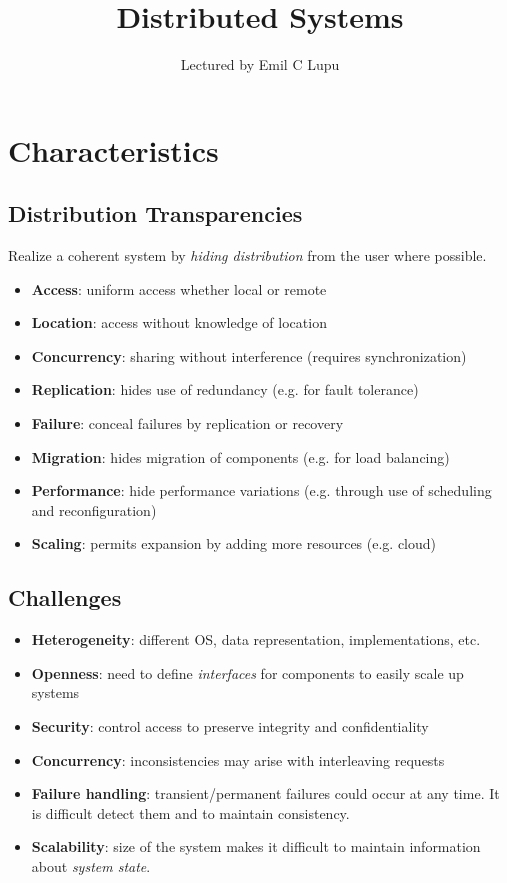 \documentclass[twocolumn,landscape,10pt]{article}
\author{Lectured by Emil C Lupu}
\title{Distributed Systems}
\affil{Typed by Aris Zhu Yi Qing}
\theoremstyle{definition}
\begin{document}
\maketitle
\tableofcontents
\newpage

\section{Characteristics}

\subsection{Distribution Transparencies}

Realize a coherent system by \emph{hiding distribution} from the user where
possible.

\begin{itemize}
    \item \textbf{Access}: uniform access whether local or remote
    \item \textbf{Location}: access without knowledge of location
    \item \textbf{Concurrency}: sharing without interference (requires synchronization)
    \item \textbf{Replication}: hides use of redundancy (e.g. for fault tolerance)
    \item \textbf{Failure}: conceal failures by replication or recovery
    \item \textbf{Migration}: hides migration of components (e.g. for load balancing)
    \item \textbf{Performance}: hide performance variations (e.g. through use of
        scheduling and reconfiguration)
    \item \textbf{Scaling}: permits expansion by adding more resources (e.g. cloud)
\end{itemize} 

\subsection{Challenges}

\begin{itemize}
    \item \textbf{Heterogeneity}: different OS, data
        representation, implementations, etc.
    \item \textbf{Openness}: need to define \emph{interfaces} for components to
        easily scale up systems
    \item \textbf{Security}: control access to preserve integrity and
        confidentiality
    \item \textbf{Concurrency}: inconsistencies may arise with interleaving
        requests
    \item \textbf{Failure handling}: transient/permanent failures could occur at
        any time. It is difficult detect them and to maintain consistency.
    \item \textbf{Scalability}: size of the system makes it difficult to
        maintain information about \emph{system state}.
\end{itemize} 
\end{document}
